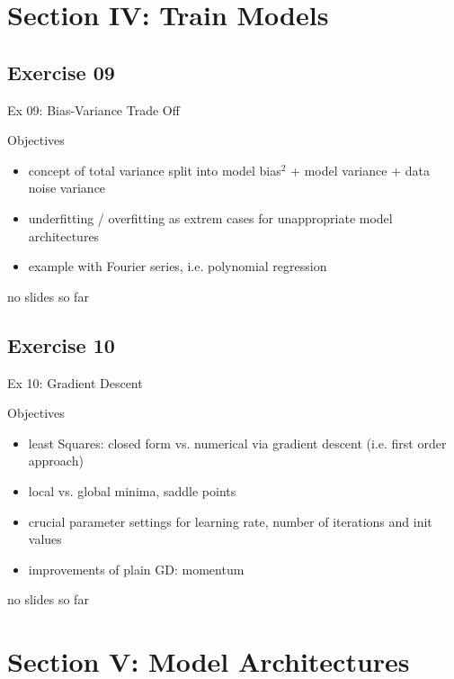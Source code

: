\documentclass[mathserif, aspectratio=1610]{intbeamer}
\begin{document}
\section{Section IV: Train Models}

\subsection{Exercise 09}
\begin{frame}{Ex 09: Bias-Variance Trade Off}

Objectives
\begin{itemize}
\item concept of total variance split into model bias$^2$ + model variance + data noise variance
\item underfitting / overfitting as extrem cases for unappropriate model architectures
\item example with Fourier series, i.e. polynomial regression
\end{itemize}

no slides so far


\end{frame}

\subsection{Exercise 10}
\begin{frame}{Ex 10: Gradient Descent}

Objectives
\begin{itemize}
\item least Squares: closed form vs. numerical via gradient descent (i.e. first order approach)
\item local vs. global minima, saddle points
\item crucial parameter settings for learning rate, number of iterations and init values
\item improvements of plain GD: momentum
\end{itemize}

no slides so far

\end{frame}




\section{Section V: Model Architectures}
\end{document}
